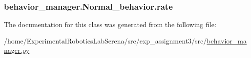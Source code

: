 \subsubsection[{\texorpdfstring{rate}{rate}}]{\setlength{\rightskip}{0pt plus 5cm}behavior\+\_\+manager.\+Normal\+\_\+behavior.\+rate}\hypertarget{classbehavior__manager_1_1Normal__behavior_a8c0881c34370caec4f5298f0ebe35489}{}\label{classbehavior__manager_1_1Normal__behavior_a8c0881c34370caec4f5298f0ebe35489}


The documentation for this class was generated from the following file\+:\begin{DoxyCompactItemize}
\item 
/home/\+Experimental\+Robotics\+Lab\+Serena/src/exp\+\_\+assignment3/src/\hyperlink{behavior__manager_8py}{behavior\+\_\+manager.\+py}\end{DoxyCompactItemize}
